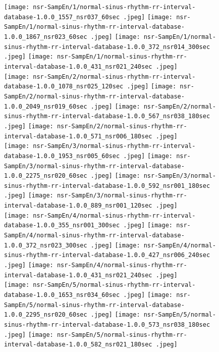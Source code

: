 \begin{figure}[h!]
    \texttt{[image: nsr-SampEn/1/normal-sinus-rhythm-rr-interval-database-1.0.0\_1557\_nsr037\_60sec .jpeg]}\hfill
    \texttt{[image: nsr-SampEn/1/normal-sinus-rhythm-rr-interval-database-1.0.0\_1867\_nsr023\_60sec .jpeg]}\hfill
    \texttt{[image: nsr-SampEn/1/normal-sinus-rhythm-rr-interval-database-1.0.0\_372\_nsr014\_300sec .jpeg]}\hfill
    \texttt{[image: nsr-SampEn/1/normal-sinus-rhythm-rr-interval-database-1.0.0\_431\_nsr021\_240sec .jpeg]}\hfill
   \\[\smallskipamount]
    \texttt{[image: nsr-SampEn/2/normal-sinus-rhythm-rr-interval-database-1.0.0\_1078\_nsr025\_120sec .jpeg]}\hfill
    \texttt{[image: nsr-SampEn/2/normal-sinus-rhythm-rr-interval-database-1.0.0\_2049\_nsr019\_60sec .jpeg]}\hfill
    \texttt{[image: nsr-SampEn/2/normal-sinus-rhythm-rr-interval-database-1.0.0\_567\_nsr038\_180sec .jpeg]}\hfill
    \texttt{[image: nsr-SampEn/2/normal-sinus-rhythm-rr-interval-database-1.0.0\_571\_nsr006\_180sec .jpeg]}\hfill
    \\[\smallskipamount]
    \texttt{[image: nsr-SampEn/3/normal-sinus-rhythm-rr-interval-database-1.0.0\_1953\_nsr005\_60sec .jpeg]}\hfill
    \texttt{[image: nsr-SampEn/3/normal-sinus-rhythm-rr-interval-database-1.0.0\_2275\_nsr020\_60sec .jpeg]}\hfill
    \texttt{[image: nsr-SampEn/3/normal-sinus-rhythm-rr-interval-database-1.0.0\_592\_nsr001\_180sec .jpeg]}\hfill
    \texttt{[image: nsr-SampEn/3/normal-sinus-rhythm-rr-interval-database-1.0.0\_889\_nsr001\_120sec .jpeg]}\hfill
    \\[\smallskipamount]
    \texttt{[image: nsr-SampEn/4/normal-sinus-rhythm-rr-interval-database-1.0.0\_355\_nsr001\_300sec .jpeg]}\hfill
    \texttt{[image: nsr-SampEn/4/normal-sinus-rhythm-rr-interval-database-1.0.0\_372\_nsr023\_300sec .jpeg]}\hfill
    \texttt{[image: nsr-SampEn/4/normal-sinus-rhythm-rr-interval-database-1.0.0\_427\_nsr006\_240sec .jpeg]}\hfill
    \texttt{[image: nsr-SampEn/4/normal-sinus-rhythm-rr-interval-database-1.0.0\_431\_nsr021\_240sec .jpeg]}\hfill
    \\[\smallskipamount]
    \texttt{[image: nsr-SampEn/5/normal-sinus-rhythm-rr-interval-database-1.0.0\_1653\_nsr034\_60sec .jpeg]}\hfill
    \texttt{[image: nsr-SampEn/5/normal-sinus-rhythm-rr-interval-database-1.0.0\_2295\_nsr020\_60sec .jpeg]}\hfill
    \texttt{[image: nsr-SampEn/5/normal-sinus-rhythm-rr-interval-database-1.0.0\_573\_nsr038\_180sec .jpeg]}\hfill
    \texttt{[image: nsr-SampEn/5/normal-sinus-rhythm-rr-interval-database-1.0.0\_582\_nsr021\_180sec .jpeg]}\hfill

\end{figure}
